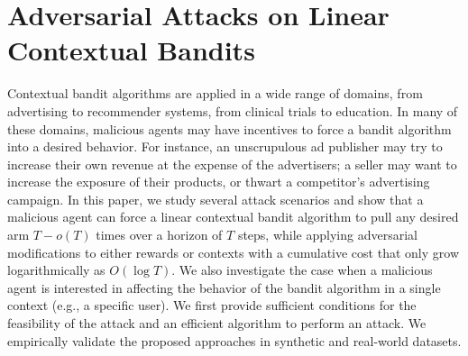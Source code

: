\newcommand{\mtb}[1]{\textcolor{black}{#1}}
\newcommand{\otc}[1]{\textcolor{black}{#1}}
\newcommand{\changede}[1]{\textcolor{black}{#1}}
\newcommand{\changebr}[1]{\textcolor{black}{#1}}
\newcommand{\changelm}[1]{\textcolor{black}{#1}}
\newcommand{\changebrtwo}[1]{\textcolor{black}{#1}}
\newcommand{\changee}[1]{\textcolor{black}{#1}}
\newcommand{\cmmnt}[1]{\ignorespaces}

\chapter{Adversarial Attacks on Linear Contextual Bandits}
\label{paper:banditsattacks}
Contextual bandit algorithms are applied in a wide range of domains, from advertising to recommender systems, from clinical trials to education. In many of these domains, malicious agents may have incentives to {force a bandit algorithm into a desired behavior.} %
For instance, an unscrupulous ad publisher may try to increase their own revenue at the expense of the advertisers; a seller may want to increase the exposure of their products, or thwart a competitor's advertising campaign.
In this paper, we study several attack scenarios and show that a malicious agent can force a linear contextual bandit algorithm to pull any desired arm $T - o(T)$ times over a horizon of $T$ steps, while applying adversarial modifications to either rewards or contexts {with a cumulative cost} that only grow logarithmically as $O(\log T)$.
We also investigate the case when a malicious agent is interested in affecting the behavior of the bandit algorithm in a single context (e.g., a specific user). We first provide sufficient conditions for the feasibility of the attack and %
an efficient algorithm to perform an attack. %
{We empirically validate the proposed approaches in synthetic and real-world datasets.} %




















